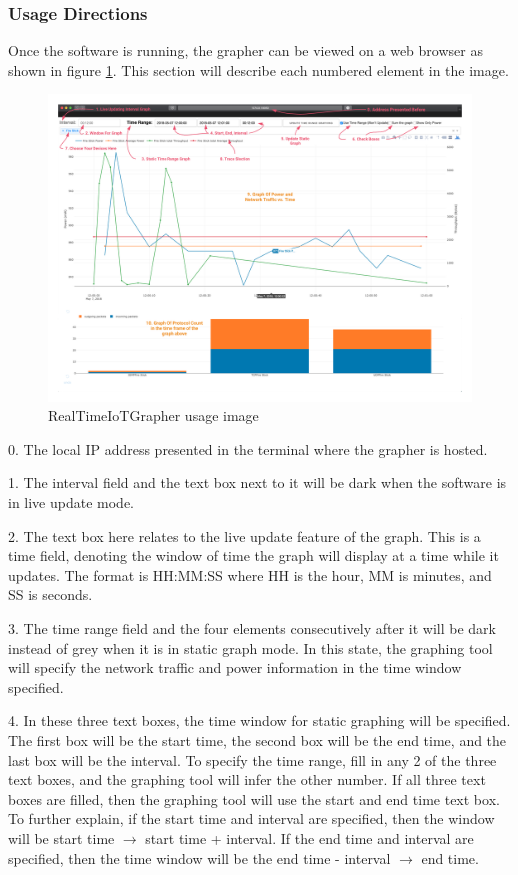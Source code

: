 \subsubsection{Usage Directions}
Once the software is running, the grapher can be viewed on a web browser as shown in figure \ref{fig:grapherUsage}. This section will describe each numbered element in the image.

\begin{figure}[H]
    \centering
    \includegraphics[width=1\textwidth]{figures/grapherUsage.png}
    \caption{RealTimeIoTGrapher usage image}
    \label{fig:grapherUsage}
\end{figure}

0. The local IP address presented in the terminal where the grapher is hosted.

1. The interval field and the text box next to it will be dark when the software is in live update mode.

2. The text box here relates to the live update feature of the graph. This is a time field, denoting the window of time the graph will display at a time while it updates. The format is HH:MM:SS where HH is the hour, MM is minutes, and SS is seconds.

3. The time range field and the four elements consecutively after it will be dark instead of grey when it is in static graph mode. In this state, the graphing tool will specify the network traffic and power information in the time window specified.

4. In these three text boxes, the time window for static graphing will be specified. The first box will be the start time, the second box will be the end time, and the last box will be the interval. To specify the time range, fill in any 2 of the three text boxes, and the graphing tool will infer the other number. If all three text boxes are filled, then the graphing tool will use the start and end time text box. To further explain, if the start time and interval are specified, then the window will be start time $\rightarrow$ start time + interval. If the end time and interval are specified, then the time window will be the end time - interval $\rightarrow$ end time.

